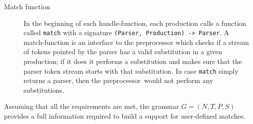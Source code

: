 \begin{description}
    \item[Match function] In the beginning of each handle-function, each
    production calls a function called \verb|match| with a signature
    \verb/(Parser, Production) -> Parser/.  A match-function is an
    interface to the preprocessor which checks if a stream of tokens
    pointed by the parser has a valid substitution in a given
    production; if it does it performs a substitution and makes sure
    that the parser token stream starts with that substitution.  In 
    case \verb|match| simply returns a parser, then the preprocessor\
    would not perform any substitutions.
\end{description}

Assuming that all the requirements are met, the grammar $G = (N, T, P,
S)$ provides a full information required to build a support for
user-defined matches.


